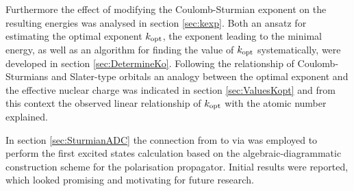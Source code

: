 Furthermore the effect of modifying the Coulomb-Sturmian
exponent on the resulting \HF energies was analysed in section \ref{sec:kexp}.
Both an ansatz for estimating the optimal exponent $k_\text{opt}$,
\ie the exponent leading to the minimal energy,
as well as
an algorithm for finding the value of $k_\text{opt}$ systematically,
were developed in section \ref{sec:DetermineKo}.
Following the relationship of Coulomb-Sturmians and Slater-type orbitals
an analogy between the optimal exponent and
the effective nuclear charge was indicated in section \ref{sec:ValuesKopt}
and from this context the observed
linear relationship of $k_\text{opt}$ with the atomic number explained.

In section \ref{sec:SturmianADC} the connection from
\molsturm to \adcman via \python
was employed to perform the first
excited states calculation based on the algebraic-diagrammatic construction
scheme for the polarisation propagator.
Initial results were reported,
which looked promising and motivating for future research.
